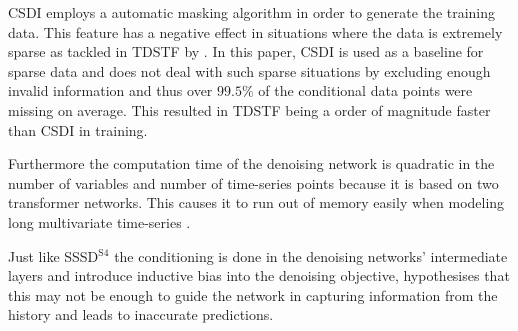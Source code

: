 CSDI employs a automatic masking algorithm in order to generate the training data. This feature has a negative effect in situations where the data is extremely sparse as tackled in TDSTF by \textcite{chang_tdstf_2023}. In this paper, CSDI is used as a baseline for sparse data and does not deal with such sparse situations by excluding enough invalid information and thus over $99.5\%$ of the conditional data points were missing on average. This resulted in TDSTF being a order of magnitude faster than CSDI in training.

Furthermore the computation time of the denoising network is quadratic in the number of variables and number of time-series points because it is based on two transformer networks. This causes it to run out of memory easily when modeling long multivariate time-series \cite{shen_non-autoregressive_2023}.

Just like SSSD$^{\text{S4}}$ the conditioning is done in the denoising networks' intermediate layers and introduce inductive bias into the denoising objective, \textcite{shen_non-autoregressive_2023} hypothesises that this may not be enough to guide the network in capturing information from the history and leads to inaccurate predictions.